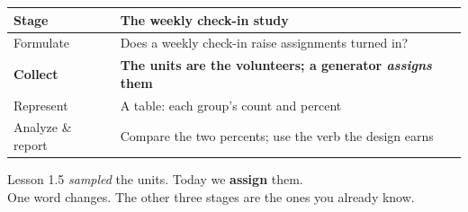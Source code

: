 \documentclass[aspectratio=169, 11pt]{beamer}
\newcommand{\redink}[1]{{\color{redacc}\bfseries #1}}
\begin{document}
\begin{frame}[t, plain]
  \vspace{4pt}
  \begin{center}
    \small
    \renewcommand{\arraystretch}{1.3}
    \begin{tabular}{@{} l l @{}}
    \hline
    \textbf{Stage} & \textbf{The weekly check-in study} \\
    \hline
    Formulate         & Does a weekly check-in raise assignments turned in? \\
    \textbf{Collect}  & \textbf{The units are the volunteers; a generator \emph{assigns} them} \\
    Represent         & A table: each group's count and percent \\
    Analyze \& report & Compare the two percents; use the verb the design earns \\
    \hline
    \end{tabular}
  \end{center}
  \vspace{8pt}
  \begin{center}
    {\large Lesson 1.5 \emph{sampled} the units. Today we \redink{assign} them.}\\[4pt]
    {\small\color{slate} One word changes. The other three stages are the ones you already
    know.}
  \end{center}
\end{frame}
\end{document}
